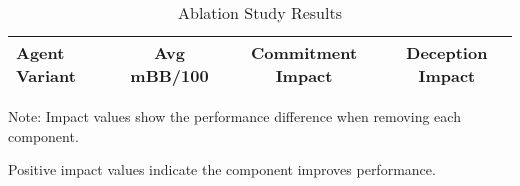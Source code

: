 
\begin{table}[htbp]
\centering
\caption{Ablation Study Results}
\label{tab:ablation_results}
\begin{tabular}{lccc}
\toprule
Agent Variant & Avg mBB/100 & Commitment Impact & Deception Impact \\
\midrule

\bottomrule
\end{tabular}
\begin{tablenotes}
\small
\item Note: Impact values show the performance difference when removing each component.
\item Positive impact values indicate the component improves performance.
\end{tablenotes}
\end{table}
